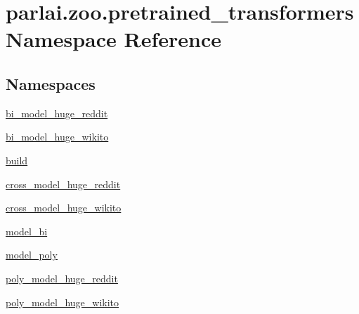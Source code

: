 \hypertarget{namespaceparlai_1_1zoo_1_1pretrained__transformers}{}\section{parlai.\+zoo.\+pretrained\+\_\+transformers Namespace Reference}
\label{namespaceparlai_1_1zoo_1_1pretrained__transformers}
\subsection*{Namespaces}
\begin{DoxyCompactItemize}
\item 
 \hyperlink{namespaceparlai_1_1zoo_1_1pretrained__transformers_1_1bi__model__huge__reddit}{bi\+\_\+model\+\_\+huge\+\_\+reddit}
\item 
 \hyperlink{namespaceparlai_1_1zoo_1_1pretrained__transformers_1_1bi__model__huge__wikito}{bi\+\_\+model\+\_\+huge\+\_\+wikito}
\item 
 \hyperlink{namespaceparlai_1_1zoo_1_1pretrained__transformers_1_1build}{build}
\item 
 \hyperlink{namespaceparlai_1_1zoo_1_1pretrained__transformers_1_1cross__model__huge__reddit}{cross\+\_\+model\+\_\+huge\+\_\+reddit}
\item 
 \hyperlink{namespaceparlai_1_1zoo_1_1pretrained__transformers_1_1cross__model__huge__wikito}{cross\+\_\+model\+\_\+huge\+\_\+wikito}
\item 
 \hyperlink{namespaceparlai_1_1zoo_1_1pretrained__transformers_1_1model__bi}{model\+\_\+bi}
\item 
 \hyperlink{namespaceparlai_1_1zoo_1_1pretrained__transformers_1_1model__poly}{model\+\_\+poly}
\item 
 \hyperlink{namespaceparlai_1_1zoo_1_1pretrained__transformers_1_1poly__model__huge__reddit}{poly\+\_\+model\+\_\+huge\+\_\+reddit}
\item 
 \hyperlink{namespaceparlai_1_1zoo_1_1pretrained__transformers_1_1poly__model__huge__wikito}{poly\+\_\+model\+\_\+huge\+\_\+wikito}
\end{DoxyCompactItemize}
